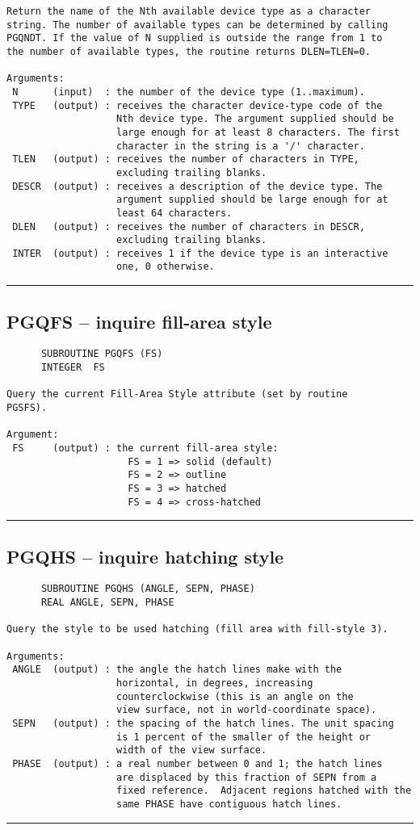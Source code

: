 {\begin{verbatim}
Return the name of the Nth available device type as a character
string. The number of available types can be determined by calling
PGQNDT. If the value of N supplied is outside the range from 1 to
the number of available types, the routine returns DLEN=TLEN=0.

Arguments:
 N      (input)  : the number of the device type (1..maximum).
 TYPE   (output) : receives the character device-type code of the
                   Nth device type. The argument supplied should be
                   large enough for at least 8 characters. The first
                   character in the string is a '/' character.
 TLEN   (output) : receives the number of characters in TYPE,
                   excluding trailing blanks.
 DESCR  (output) : receives a description of the device type. The
                   argument supplied should be large enough for at
                   least 64 characters.
 DLEN   (output) : receives the number of characters in DESCR,
                   excluding trailing blanks.
 INTER  (output) : receives 1 if the device type is an interactive
                   one, 0 otherwise.
\end{verbatim}
\hrule


\subsection*{PGQFS -- inquire fill-area style }
\begin{verbatim}
      SUBROUTINE PGQFS (FS)
      INTEGER  FS

Query the current Fill-Area Style attribute (set by routine
PGSFS).

Argument:
 FS     (output) : the current fill-area style:
                     FS = 1 => solid (default)
                     FS = 2 => outline
                     FS = 3 => hatched
                     FS = 4 => cross-hatched
\end{verbatim}
\hrule


\subsection*{PGQHS -- inquire hatching style }
\begin{verbatim}
      SUBROUTINE PGQHS (ANGLE, SEPN, PHASE)
      REAL ANGLE, SEPN, PHASE

Query the style to be used hatching (fill area with fill-style 3).

Arguments:
 ANGLE  (output) : the angle the hatch lines make with the
                   horizontal, in degrees, increasing 
                   counterclockwise (this is an angle on the
                   view surface, not in world-coordinate space).
 SEPN   (output) : the spacing of the hatch lines. The unit spacing
                   is 1 percent of the smaller of the height or
                   width of the view surface.
 PHASE  (output) : a real number between 0 and 1; the hatch lines
                   are displaced by this fraction of SEPN from a
                   fixed reference.  Adjacent regions hatched with the
                   same PHASE have contiguous hatch lines.
\end{verbatim}
\hrule


}

